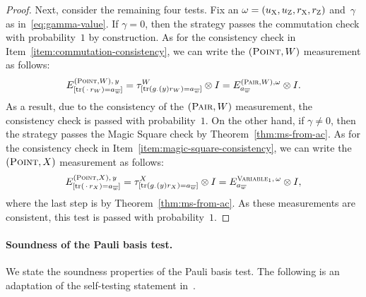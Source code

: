 \documentclass[11pt]{article}
\theoremstyle{definition}
\DeclareMathOperator{\tr}{tr}
\newcommand{\labelstyle}[1]{\ensuremath{\textsc{#1}}\xspace}
\newcommand{\xpt}{\labelstyle{X}}
\newcommand{\zpt}{\labelstyle{Z}}
\newcommand{\typestyle}[1]{\ensuremath{\textsc{#1}}\xspace}
\newcommand{\Point}{\typestyle{Point}}
\newcommand{\Pair}{\typestyle{Pair}}
\newcommand{\Variable}{\typestyle{Variable}}
\begin{document}
\begin{proof}
  Next, consider the remaining four tests.
  Fix an $\omega= (u_\xpt, u_\zpt, r_\xpt, r_\zpt)$ and~$\gamma$ as
  in~\eqref{eq:gamma-value}.
  If $\gamma = 0$, then the strategy passes the commutation check with
  probability~$1$ by construction.
  As for the consistency check in Item~\ref{item:commutation-consistency},
  we can write the $(\Point, W)$ measurement as follows: 
  \begin{equation*}
  E^{(\Point,W),\, y}_{[\tr(\,\cdot\, r_W) = a_{\overline{w}}]}
  = \tau^W_{[\tr(g_{\cdot}(y)r_W) = a_{\overline{w}}]} \otimes I
  = E^{(\Pair, W), \omega}_{a_{\overline{w}}} \otimes I.
  \end{equation*}
  As a result, due to the consistency of the $(\Pair, W)$ measurement, the
  consistency check is passed with probability~$1$.
  On the other hand, if $\gamma \neq 0$, then the strategy passes the Magic
  Square check by Theorem~\ref{thm:ms-from-ac}.
  As for the consistency check in Item~\ref{item:magic-square-consistency}, we
  can write the $(\Point, X)$ measurement as follows:
  \begin{equation*}
  E^{(\Point,X),\, y}_{[\tr(\,\cdot\, r_X) = a_{\overline{w}}]}
  = \tau^X_{[\tr(g_{\cdot}(y)r_X) = a_{\overline{w}}]} \otimes I
  = E^{\Variable_1,\, \omega}_{a_{\overline{w}}} \otimes I,
  \end{equation*}
  where the last step is by Theorem~\ref{thm:ms-from-ac}.
  As these measurements are consistent, this test is passed with
  probability~$1$.
\end{proof}





\paragraph{Soundness of the Pauli basis test.} 
We state the soundness properties of the Pauli basis test.
The following is an adaptation of the self-testing statement in~\cite[Theorem
6.4]{NW19}.
\end{document}
